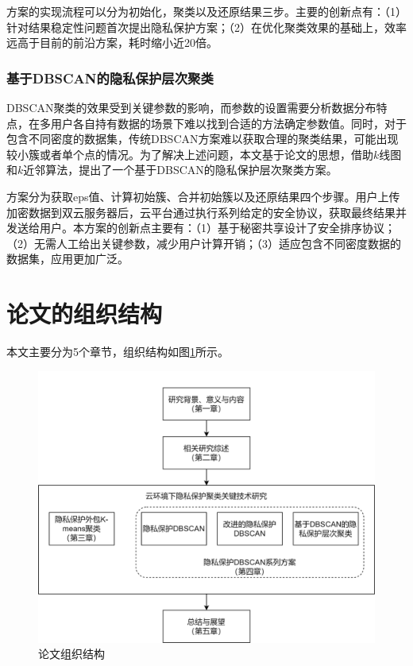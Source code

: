 方案的实现流程可以分为初始化，聚类以及还原结果三步。主要的创新点有：（1）针对结果稳定性问题首次提出隐私保护方案；（2）在优化聚类效果的基础上，效率远高于目前的前沿方案\cite{bozdemir2021privacy}，耗时缩小近20倍。

\subsubsection{基于DBSCAN的隐私保护层次聚类}
DBSCAN聚类的效果受到关键参数的影响，而参数的设置需要分析数据分布特点，在多用户各自持有数据的场景下难以找到合适的方法确定参数值。同时，对于包含不同密度的数据集，传统DBSCAN方案难以获取合理的聚类结果，可能出现较小簇或者单个点的情况。为了解决上述问题，本文基于论文\cite{latifi2021dbhc}的思想，借助$ k $线图和$ k $近邻算法，提出了一个基于DBSCAN的隐私保护层次聚类方案。

方案分为获取eps值、计算初始簇、合并初始簇以及还原结果四个步骤。用户上传加密数据到双云服务器后，云平台通过执行系列给定的安全协议，获取最终结果并发送给用户。本方案的创新点主要有：（1）基于秘密共享设计了安全排序协议；（2）无需人工给出关键参数，减少用户计算开销；（3）适应包含不同密度数据的数据集，应用更加广泛。

\section{论文的组织结构}

本文主要分为5个章节，组织结构如图\ref{lunwenjiegou}所示。
\begin{figure}[htbp]
	\centering
	\includegraphics[scale=0.9]{img/dd.png}%
	\caption{论文组织结构}
	\label{lunwenjiegou}
\end{figure}

